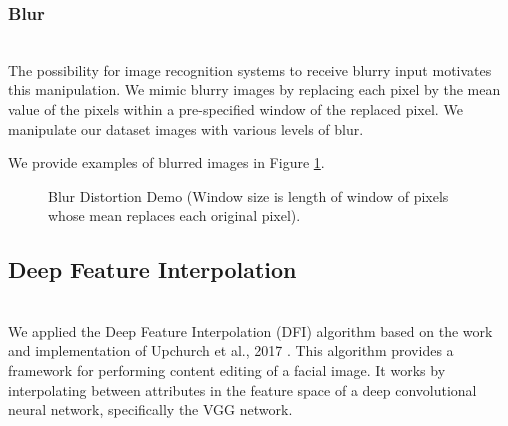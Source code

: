 \documentclass[pageno]{cos429}
\begin{document}
\subsubsection{Blur}\hspace*{\fill} \\
The possibility for image recognition systems to receive blurry input motivates this manipulation. We mimic blurry images by replacing each pixel by the mean value of the pixels within a pre-specified window of the replaced pixel. We manipulate our dataset images with various levels of blur.

We provide examples of blurred images in Figure \ref{fig:manipulationdemo_blur}.
\begin{figure}[!htb]
\caption{Blur Distortion Demo (Window size is length of window of pixels whose mean replaces each original pixel).}
\label{fig:manipulationdemo_blur}
\end{figure}

\subsection{Deep Feature Interpolation}\hspace*{\fill} \\
We applied the Deep Feature Interpolation (DFI) algorithm based on the work and implementation of Upchurch et al., 2017 \cite{upchurch_deep_2016}. This algorithm provides a framework for performing content editing of a facial image. It works by interpolating between attributes in the feature space of a deep convolutional neural network, specifically the VGG network.
\end{document}
